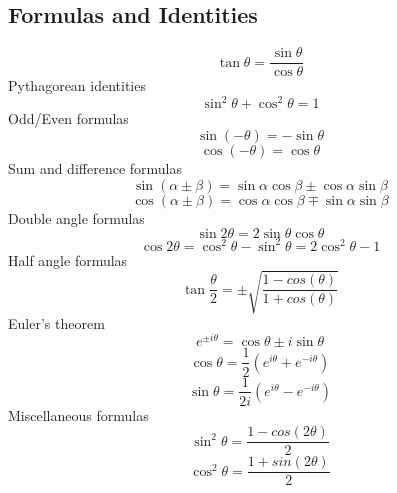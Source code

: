 \documentclass{article}
\begin{document}
	\subsection{Formulas and Identities}
		\begin{equation}
			\tan \theta = \frac{\sin \theta}{\cos \theta}
		\end{equation}
		Pythagorean identities
		\begin{equation}
			\sin^2 \theta + \cos^2 \theta = 1
		\end{equation}
		Odd/Even formulas
		\begin{equation}
			\sin(-\theta) = - \sin \theta 
		\end{equation}
		\begin{equation}
			\cos(-\theta) = \cos \theta 
		\end{equation}
		Sum and difference formulas
		\begin{equation}
			\sin \left( {\alpha \pm \beta} \right) = \sin \alpha \cos \beta \pm \cos \alpha \sin \beta
		\end{equation}
		\begin{equation}
			\cos \left( {\alpha \pm \beta } \right) = \cos \alpha \cos \beta \mp \sin \alpha \sin \beta
		\end{equation}
		Double angle formulas
		\begin{equation}
			\sin 2\theta = 2\sin \theta \cos \theta
		\end{equation}
		\begin{equation}
			\cos 2\theta = \cos ^2 \theta - \sin ^2 \theta = 2\cos ^2 \theta - 1
		\end{equation}
		Half angle formulas
		\begin{equation}
			\tan \frac{\theta}{2} = \pm \sqrt{\frac{1-cos(\theta)}{1+cos(\theta)}}
		\end{equation}
		Euler's theorem
		\begin{equation}
			e^{ \pm i\theta } = \cos \theta \pm i\sin \theta
		\end{equation}
		\begin{equation}
			\cos \theta = \frac{1}{2} (e^{i\theta} + e^{-i\theta})
		\end{equation}
		\begin{equation}
			\sin \theta = \frac{1}{2i} (e^{i\theta} - e^{-i\theta})
		\end{equation}
		Miscellaneous formulas
		\begin{equation}
			\sin ^2 \theta = \frac{1-cos(2\theta)}{2}
		\end{equation}		
		\begin{equation}
			\cos ^2 \theta = \frac{1+sin(2\theta)}{2}
		\end{equation}
\end{document}
